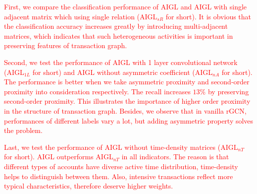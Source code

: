 \textcolor{red}{
First, we compare the classification performance of AIGL and AIGL with single adjacent matrix which using single relation (AIGL$_{sR}$ for short). It is obvious that the classification accuracy increases greatly by introducing multi-adjacent matrices, which indicates that such heterogeneous activities is important in preserving features of transaction graph.
}

\textcolor{red}{
 Second, we test the performance of AIGL with 1 layer convolutional network (AIGL$_{1L}$ for short) and AIGL without asymmetric coefficient (AIGL$_{nA}$ for short). The performance is better when we take asymmetric proximity and second-order proximity into consideration respectively.
The recall increases $13$\% by preserving second-order proximity. This illustrates the importance of higher order proximity in the structure of transaction graph. Besides, we observe that in vanilla rGCN, performances of different labels vary a lot, but adding asymmetric property solves the problem.
}

\textcolor{red}{
Last, we test the performance of AIGL without time-density matrices (AIGL$_{nT}$ for short). AIGL outperforms AIGL$_{nT}$ in all indicators. The reason is that different types of accounts have diverse active time distribution, time-density helps to distinguish between them. Also, intensive transactions reflect more typical characteristics, therefore deserve higher weights.
}



